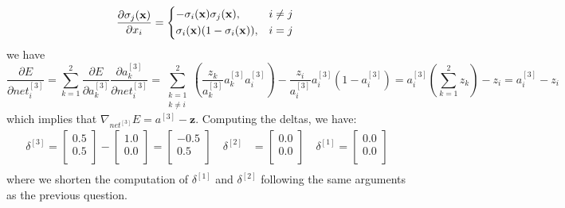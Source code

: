 \documentclass{exam}
\begin{document}
\begin{questions}
\begin{itemize}
\begin{equation*}
                \frac{\partial \sigma_j(\mathbf{x})}{\partial x_i} = 
                    \begin{cases*}
                        -\sigma_i(\mathbf{x}) \sigma_j(\mathbf{x}), & $i \neq j$ \\
                        \sigma_i(\mathbf{x}) ( 1 - \sigma_i(\mathbf{x})), & $i = j$
                    \end{cases*}
                \end{equation*}
                we have
                \begin{equation*}
                    \frac{\partial E}{\partial net_i^{[3]}} = 
                    \sum_{k = 1}^{2} \frac{\partial E}{\partial a_k^{[3]}} \frac{\partial a_k^{[3]}}{\partial net_i^{[3]}} =
                    \sum_{\substack{ k = 1 \\ k \neq i}}^{2} \left(\frac{z_k}{a_k^{[3]}} a_k^{[3]} a_i^{[3]}\right) - \frac{z_i}{a_i^{[3]}} a_i^{[3]} ( 1 - a_i^{[3]})  = a_i^{[3]} \left(\sum_{k = 1}^{2} z_k\right) - z_i = a_i^{[3]} - z_i 
                \end{equation*}
                which implies that $\nabla_{net^{[3]}} E = a^{[3]} - \mathbf{z}$. Computing the deltas, we have:
                \begin{align*}
                    \delta^{[3]} = 
                    \begin{bmatrix}
                        0.5  \\
                        0.5 \\
                    \end{bmatrix} -
                    \begin{bmatrix}
                        1.0  \\
                        0.0  \\
                    \end{bmatrix} = 
                    \begin{bmatrix}
                        -0.5  \\
                        0.5  \\
                    \end{bmatrix} \quad
                    \delta^{[2]} &= 
                    \begin{bmatrix}
                        0.0  \\
                        0.0  \\
                    \end{bmatrix} \quad
                    \delta^{[1]} = 
                    \begin{bmatrix}
                        0.0  \\
                        0.0  \\
                    \end{bmatrix} \\
                \end{align*} 
                where we shorten the computation of $\delta^{[1]}$ and $\delta^{[2]}$ following the same arguments as the previous question.


\end{itemize}
\end{questions}
\end{document}
